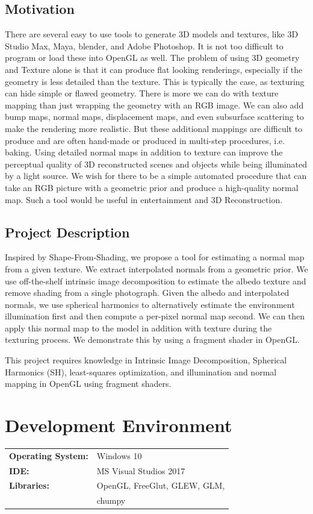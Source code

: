 \documentclass[10pt,twocolumn,letterpaper]{article}
\begin{document}
\subsection{Motivation}
 There are several easy to use tools to generate 3D models and textures, like 3D Studio Max, Maya, blender, and Adobe Photoshop. It is not too difficult to program or load these into OpenGL as well. The problem of using 3D geometry and Texture alone is that it can produce flat looking renderings, especially if the geometry is less detailed than the texture. This is typically the case, as texturing can hide simple or flawed geometry. There is more we can do with texture mapping than just wrapping the geometry with an RGB image. We can also add bump maps, normal maps, displacement maps, and even subsurface scattering to make the rendering more realistic. But these additional mappings are difficult to produce and are often hand-made or produced in multi-step procedures, i.e. baking. Using detailed normal maps in addition to texture can improve the perceptual quality of 3D reconstructed scenes and objects while being illuminated by a light source. We wish for there to be a simple automated procedure that can take an RGB picture with a geometric prior and produce a high-quality normal map. Such a tool would be useful in entertainment and 3D Reconstruction.


\subsection{Project Description}
Inspired by Shape-From-Shading, we propose a tool for estimating a normal map from a given texture. We extract interpolated normals from a geometric prior. We use off-the-shelf intrinsic image decomposition to estimate the albedo texture and remove shading from a single photograph. Given the albedo and interpolated normals, we use spherical harmonics to alternatively estimate the environment illumination first and then compute a per-pixel normal map second. We can then apply this normal map to the model in addition with texture during the texturing process. We demonstrate this by using a fragment shader in OpenGL. \par
This project requires knowledge in Intrinsic Image Decomposition, Spherical Harmonics (SH), least-squares optimization, and illumination and normal mapping in OpenGL using fragment shaders.

\section{Development Environment}
\begin{table}[h]
	\begin{tabular}{ll}
		\textbf{Operating System:} &  Windows 10  \\
		\textbf{IDE:} &  MS Visual Studios 2017  \\
		\textbf{Libraries:} &  OpenGL, FreeGlut, GLEW, GLM,\\
		&chumpy
	\end{tabular}
\end{table}
\end{document}
